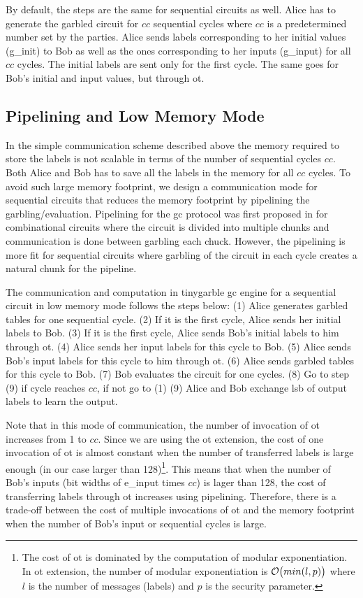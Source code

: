 By default, the steps are the same for sequential circuits as well.
Alice has to generate the garbled circuit for $cc$ sequential cycles where $cc$ is a predetermined number set by the parties.
Alice sends labels corresponding to her initial values (g\_init) to Bob as well as the ones corresponding to her inputs (g\_input) for all $cc$ cycles.
The initial labels are sent only for the first cycle.
The same goes for Bob's initial and input values, but through \acrshort{ot}.

\subsection{Pipelining and Low Memory Mode}\label{sec:engine-memory}
In the simple communication scheme described above the memory required to store the labels is not scalable in terms of the number of sequential cycles $cc$.
Both Alice and Bob has to save all the labels in the memory for all $cc$ cycles.
To avoid such large memory footprint, we design a communication mode for sequential circuits that reduces the memory footprint by pipelining the garbling/evaluation.
Pipelining for the \acrshort{gc} protocol was first proposed in \cite{husted2013gpu} for combinational circuits where the circuit is divided into multiple chunks and communication is done between garbling each chuck.
However, the pipelining is more fit for sequential circuits where garbling of the circuit in each cycle creates a natural chunk for the pipeline.

The communication and computation in \gls{tinygarble} \acrshort{gc} engine for a sequential circuit in low memory mode follows the steps below:
(1) Alice generates garbled tables for one sequential cycle.
(2) If it is the first cycle, Alice sends her initial labels to Bob.
(3) If it is the first cycle, Alice sends Bob's initial labels to him through \acrshort{ot}.
(4) Alice sends her input labels for this cycle to Bob.
(5) Alice sends Bob's input labels for this cycle to him through \acrshort{ot}.
(6) Alice sends garbled tables for this cycle to Bob.
(7) Bob evaluates the circuit for one cycles.
(8) Go to step (9) if cycle reaches $cc$, if not go to (1)
(9) Alice and Bob exchange \acrshort{lsb} of output labels to learn the output.

Note that in this mode of communication, the number of invocation of \acrshort{ot} increases from 1 to $cc$.
Since we are using the \acrshort{ot} extension, the cost of one invocation of \acrshort{ot} is almost constant when the number of transferred labels is large enough (in our case larger than 128)\footnote{The cost of \acrshort{ot} is dominated by the computation of modular exponentiation. In \acrshort{ot} extension, the number of modular exponentiation is $\mathcal{O}\bigl(min(l, p)\bigr)$ where $l$ is the number of messages (labels) and $p$ is the security parameter.}.
This means that when the number of Bob's inputs (bit widths of e\_input times $cc$) is lager than 128, the cost of transferring labels through \acrshort{ot} increases using pipelining.
Therefore, there is a trade-off between the cost of multiple invocations of \acrshort{ot} and the memory footprint when the number of Bob's input or sequential cycles is large.

